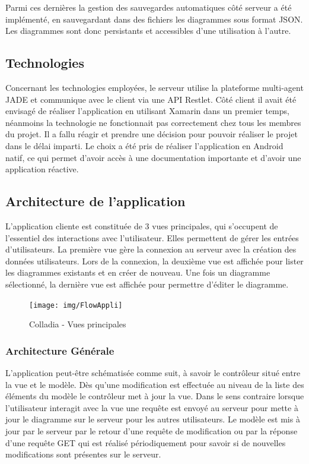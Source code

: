 Parmi ces dernières la gestion des sauvegardes automatiques côté serveur a été implémenté, en sauvegardant dans des fichiers les diagrammes sous format JSON. Les diagrammes sont donc persistants et accessibles d'une utilisation à l'autre.

\newpage
\subsection{Technologies}
Concernant les technologies employées, le serveur utilise la plateforme multi-agent JADE et communique avec le client via une API Restlet.
Côté client il avait été envisagé de réaliser l'application en utilisant Xamarin dans un premier temps, néanmoins la technologie ne fonctionnait pas correctement chez tous les membres du projet.
Il a fallu réagir et prendre une décision pour pouvoir réaliser le projet dans le délai imparti.
Le choix a été pris de réaliser l'application en Android natif, ce qui permet d'avoir accès à une documentation importante et d'avoir une application réactive.
\vspace*{-.5cm}

\subsection{Architecture de l'application}
L'application cliente est constituée de 3 vues principales, qui s'occupent de l'essentiel des interactions avec l'utilisateur.
Elles permettent de gérer les entrées d'utilisateurs.
La première vue gère la connexion au serveur avec la création des données utilisateurs. Lors de la connexion, la deuxième vue est affichée pour lister les diagrammes existants et en créer de nouveau.
Une fois un diagramme sélectionné, la dernière vue est affichée pour permettre d'éditer le diagramme. 
	
 	\vspace*{\fill}
	\begin{figure}[!h]
		\centering
		\texttt{[image: img/FlowAppli]}
		\caption{Colladia - Vues principales}
	\end{figure}
 	\vspace*{\fill}
\vspace*{-.5cm}

\subsubsection{Architecture Générale}
L'application peut-être schématisée comme suit, à savoir le contrôleur situé entre la vue et le modèle. Dès qu'une modification est effectuée au niveau de la liste des éléments du modèle le contrôleur met à jour la vue.
Dans le sens contraire lorsque l'utilisateur interagit avec la vue une requête est envoyé au serveur pour mette à jour le diagramme sur le serveur pour les autres utilisateurs.
Le modèle est mis à jour par le serveur par le retour d'une requête de modification ou par la réponse d'une requête GET qui est réalisé périodiquement pour savoir si de nouvelles modifications sont présentes sur le serveur.

